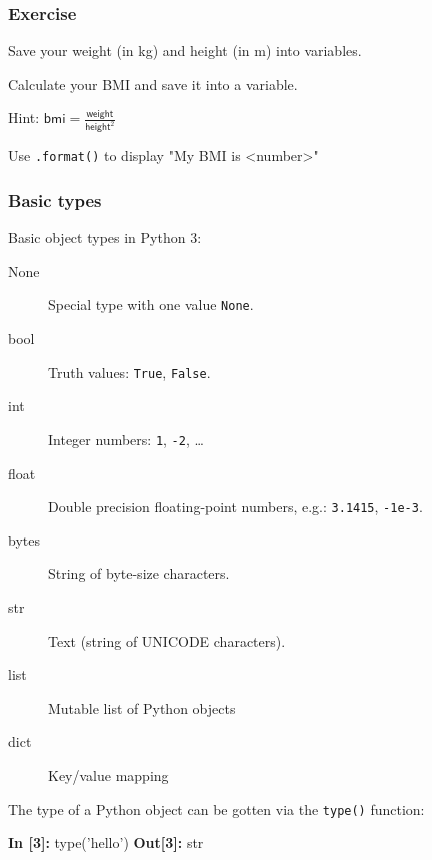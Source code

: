 \documentclass[english,serif,mathserif,xcolor=pdftex,dvipsnames,table]{beamer}
\begin{document}
\begin{frame}[fragile]
  \frametitle{Exercise}

  \begin{exercise*}[1.B]

    Save your weight (in kg) and height (in m) into variables.

    Calculate your BMI and save it into a variable.

    \+
    Hint: $\mathsf{bmi} = \frac{\mathsf{weight}}{\mathsf{height}^2}$

    \+
    Use \texttt{.format()} to display "My BMI is <number>"
  \end{exercise*}
\end{frame}

\begin{frame}[fragile]
  \frametitle{Basic types}
  Basic object types in Python 3:
  \begin{description}
  \item[None] Special type with one value \texttt{None}.
  \item[bool] Truth values: \texttt{True}, \texttt{False}.
  \item[int] Integer numbers: \texttt{1}, \texttt{-2}, \ldots
  \item[float] Double precision floating-point numbers, e.g.:
    \texttt{3.1415}, \texttt{-1e-3}.
  \item[bytes] String of byte-size characters.
  \item[str] Text (string of UNICODE characters).
  \item[list] Mutable list of Python objects
  \item[dict] Key/value mapping
  \end{description}

  \+ The type of a Python object can be gotten via the \texttt{type()} function:
\begin{semiverbatim}
{\color{blue}\bfseries In [3]:} type('hello')
{\color{red}\bfseries Out[3]:} str
\end{semiverbatim}
\end{frame}
\end{document}
